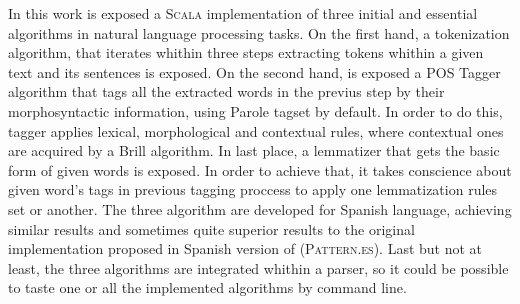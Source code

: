 
In this work is exposed a \textsc{Scala} implementation of three initial and 	essential algorithms in natural language processing tasks. On the first hand, a tokenization algorithm, that iterates whithin three steps extracting tokens whithin a given text and its sentences is exposed. On the second hand, is exposed a POS Tagger algorithm that tags all the extracted words in the previus step by their morphosyntactic information, using \textsf{Parole} tagset by default. In order to do this, tagger applies lexical, morphological and contextual rules, where contextual ones are acquired by a Brill algorithm. In last place, a lemmatizer that gets the basic form of given words is exposed. In order to achieve that, it takes conscience about given word's tags in previous tagging proccess to apply one lemmatization rules set or another.\newline
The three algorithm are developed for Spanish language, achieving similar results and sometimes quite superior results to the original implementation proposed in Spanish version of \citet{smedt2012pattern} (\textsc{Pattern.es}).
Last but not at least, the three algorithms are integrated whithin a parser, so it could be possible to taste one or all the implemented algorithms by command line.   
\newline

